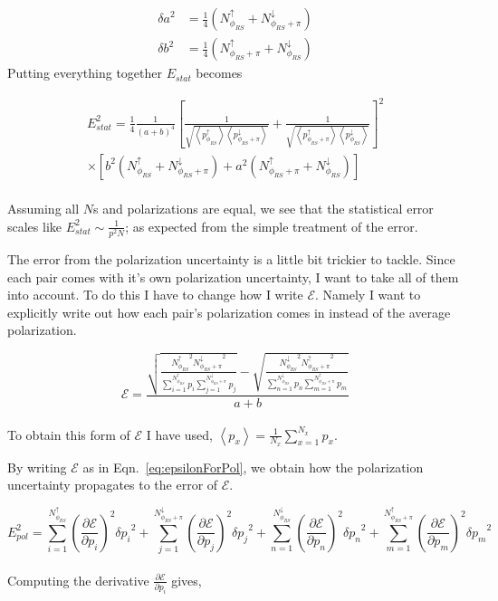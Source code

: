 \documentclass[letterpaper, abstract = on,listof=totoc, bibliography=totoc]{scrreprt}
\newcommand{\phirs}{\phi_{RS}}
\begin{document}
\begin{align}
{\delta a}^2 &= \frac{1}{4}\left(N^\uparrow_{\phirs}+ N^\downarrow_{\phirs+\pi}\right)\\
{\delta b}^2 &=  \frac{1}{4}\left(N^\uparrow_{\phirs+\pi}+ N^\downarrow_{\phirs}\right)
\end{align}
%
Putting everything together $E_{stat}$ becomes

\begin{align}
E_{stat}^2 = \frac{1}{4}\frac{1}{\left(a+b\right)^4} \left[\frac{1}{\sqrt{\left<p^\uparrow_{\phirs}\right>\left<p^\downarrow_{\phirs+\pi}\right>}}+\frac{1}{\sqrt{\left<p^\uparrow_{\phirs+\pi}\right>\left<p^\downarrow_{\phirs}\right>}}\right]^2 \\ \nonumber
\times \left[b^2\left(N^\uparrow_{\phirs} + N^\downarrow_{\phirs+\pi}\right) + a^2 \left(N^\uparrow_{\phirs+\pi} +  N^\downarrow_{\phirs} \right)\right]
\end{align}\\
%
Assuming all $N$s and polarizations are equal, we see that the statistical error scales like $E_{stat}^2 \sim \frac{1}{p^2 N}$; as expected from the simple treatment of the error.

The error from the polarization uncertainty is a little bit trickier to tackle. Since each pair comes with it's own polarization uncertainty, I want to take all of them into account. To do this I have to change how I write $\mathcal{E}$. Namely I want to explicitly write out how each pair's polarization comes in instead of the average polarization. 

\begin{equation}
\label{eq:epsilonForPol}
\mathcal{E} = \frac{   \sqrt{\frac{{N^\uparrow_{\phirs}}^2 {N^\downarrow_{\phirs+\pi}}^2}{\sum\limits_{i=1}^{N^\uparrow_{\phirs}} p_i \sum\limits_{j=1}^{N^\downarrow_{\phirs+\pi}} p_j}} - \sqrt{\frac{{N^\downarrow_{\phirs}}^2 {N^\uparrow_{\phirs+\pi}}^2}{\sum\limits_{n=1}^{N^\downarrow_{\phirs}} p_n \sum\limits_{m=1}^{N^\uparrow_{\phirs+\pi}} p_m}}   }  {a+b}
\end{equation}\\
%
To obtain this form of $\mathcal{E}$ I have used, $\left<p_x\right> = \frac{1}{N_x}\sum\limits_{x=1}^{N_x} p_x$. 

By writing $\mathcal{E}$ as in Eqn.~\ref{eq:epsilonForPol}, we obtain how the polarization uncertainty propagates to the error of $\mathcal{E}$.

\begin{equation}
\label{eq:Epol}
E_{pol}^2 = \sum\limits_{i=1}^{N^\uparrow_{\phirs}} \left(\frac{\partial\mathcal{E}}{\partial p_i}\right)^2 {\delta p_i}^2 + \sum\limits_{j=1}^{N^\downarrow_{\phirs+\pi}} \left(\frac{\partial\mathcal{E}}{\partial p_j}\right)^2  {\delta p_j}^2 + \sum\limits_{n=1}^{N^\downarrow_{\phirs}}\left(\frac{\partial\mathcal{E}}{\partial p_n}\right)^2  {\delta p_n}^2 +\sum\limits_{m=1}^{N^\uparrow_{\phirs+\pi}} \left(\frac{\partial\mathcal{E}}{\partial p_m}\right)^2  {\delta p_m}^2
\end{equation}\\
%
Computing the derivative $\frac{\partial\mathcal{E}}{\partial p_i}$ gives, 
\end{document}
